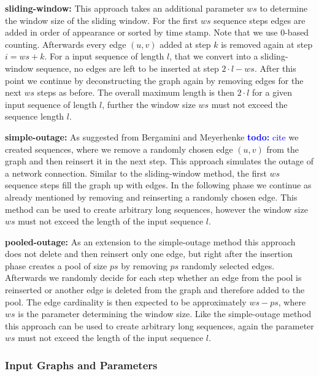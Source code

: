 \documentclass{article}      %
\newcommand\todo[1]{\textcolor{blue}{\textbf{todo: }#1}}
\begin{document}
\bigskip \noindent
\textbf{sliding-window:} This approach takes an additional parameter $ws$ to determine the window size of the sliding window. For the first $ws$ sequence steps edges are added in order of appearance or sorted by time stamp. Note that we use $0$-based counting. Afterwards every edge $(u,v)$ added at step $k$ is removed again at step $i=ws+k$. For a input sequence of length $l$, that we convert into a sliding-window sequence, no edges are left to be inserted at step $2 \cdot l - ws$. After this point we continue by deconstructing the graph again by removing edges for the next $ws$ steps as before. The overall maximum length is then $2 \cdot l$ for a given input sequence of length $l$, further the window size $ws$ must not exceed the sequence length $l$.

\bigskip \noindent
\textbf{simple-outage:} As suggested from Bergamini and Meyerhenke \todo{cite} we created sequences, where we remove a randomly chosen edge $(u,v)$ from the graph and then reinsert it in the next step. This approach simulates the outage of a network connection. Similar to the sliding-window method, the first $ws$ sequence steps fill the graph up with edges. In the following phase we continue as already mentioned by removing and reinserting a randomly chosen edge. This method can be used to create arbitrary long sequences, however the window size $ws$ must not exceed the length of the input sequence $l$.

\bigskip \noindent
\textbf{pooled-outage:} As an extension to the simple-outage method this approach does not delete and then reinsert only one edge, but right after the insertion phase creates a pool of size $ps$ by removing $ps$ randomly selected edges. Afterwards we randomly decide for each step whether an edge from the pool is reinserted or another edge is deleted from the graph and therefore added to the pool. The edge cardinality is then expected to be approximately $ws-ps$, where $ws$ is the parameter determining the window size. Like the simple-outage method this approach can be used to create arbitrary long sequences, again the parameter $ws$ must not exceed the length of the input sequence $l$.

\subsubsection{Input Graphs and Parameters}
\label{sec:in-graphs}
\end{document}
